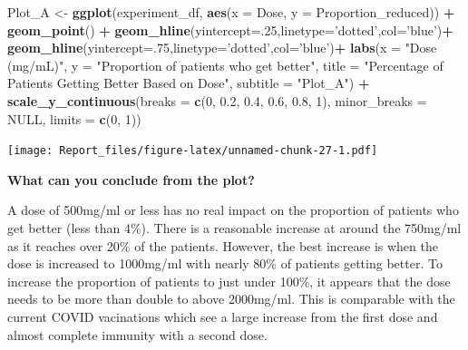 \documentclass[
]{article}
\newenvironment{Shaded}{\begin{snugshade}}{\end{snugshade}}
\newcommand{\DataTypeTok}[1]{\textcolor[rgb]{0.13,0.29,0.53}{#1}}
\newcommand{\DecValTok}[1]{\textcolor[rgb]{0.00,0.00,0.81}{#1}}
\newcommand{\FloatTok}[1]{\textcolor[rgb]{0.00,0.00,0.81}{#1}}
\newcommand{\KeywordTok}[1]{\textcolor[rgb]{0.13,0.29,0.53}{\textbf{#1}}}
\newcommand{\NormalTok}[1]{#1}
\newcommand{\OperatorTok}[1]{\textcolor[rgb]{0.81,0.36,0.00}{\textbf{#1}}}
\newcommand{\OtherTok}[1]{\textcolor[rgb]{0.56,0.35,0.01}{#1}}
\newcommand{\StringTok}[1]{\textcolor[rgb]{0.31,0.60,0.02}{#1}}
\begin{document}
\begin{Shaded}
\begin{Highlighting}[]
\NormalTok{Plot_A <-}\StringTok{ }
\StringTok{  }\KeywordTok{ggplot}\NormalTok{(experiment_df, }\KeywordTok{aes}\NormalTok{(}\DataTypeTok{x =}\NormalTok{ Dose, }\DataTypeTok{y =}\NormalTok{ Proportion_reduced)) }\OperatorTok{+}
\StringTok{    }\KeywordTok{geom_point}\NormalTok{() }\OperatorTok{+}
\StringTok{    }\KeywordTok{geom_hline}\NormalTok{(}\DataTypeTok{yintercept=}\NormalTok{.}\DecValTok{25}\NormalTok{,}\DataTypeTok{linetype=}\StringTok{'dotted'}\NormalTok{,}\DataTypeTok{col=}\StringTok{'blue'}\NormalTok{)}\OperatorTok{+}
\StringTok{    }\KeywordTok{geom_hline}\NormalTok{(}\DataTypeTok{yintercept=}\NormalTok{.}\DecValTok{75}\NormalTok{,}\DataTypeTok{linetype=}\StringTok{'dotted'}\NormalTok{,}\DataTypeTok{col=}\StringTok{'blue'}\NormalTok{)}\OperatorTok{+}
\StringTok{    }\KeywordTok{labs}\NormalTok{(}\DataTypeTok{x =} \StringTok{"Dose (mg/mL)"}\NormalTok{,}
          \DataTypeTok{y =} \StringTok{"Proportion of patients who get better"}\NormalTok{,}
          \DataTypeTok{title =} \StringTok{"Percentage of Patients Getting Better Based on Dose"}\NormalTok{,}
          \DataTypeTok{subtitle =} \StringTok{"Plot_A"}\NormalTok{) }\OperatorTok{+}
\StringTok{    }\KeywordTok{scale_y_continuous}\NormalTok{(}\DataTypeTok{breaks =} \KeywordTok{c}\NormalTok{(}\DecValTok{0}\NormalTok{, }\FloatTok{0.2}\NormalTok{, }\FloatTok{0.4}\NormalTok{, }\FloatTok{0.6}\NormalTok{, }\FloatTok{0.8}\NormalTok{, }\DecValTok{1}\NormalTok{),}
                        \DataTypeTok{minor_breaks =} \OtherTok{NULL}\NormalTok{,}
                        \DataTypeTok{limits =} \KeywordTok{c}\NormalTok{(}\DecValTok{0}\NormalTok{, }\DecValTok{1}\NormalTok{))}
\end{Highlighting}
\end{Shaded}

\texttt{[image: Report\_files/figure-latex/unnamed-chunk-27-1.pdf]}

\textbf{What can you conclude from the plot?}

A dose of 500mg/ml or less has no real impact on the proportion of
patients who get better (less than 4\%). There is a reasonable increase
at around the 750mg/ml as it reaches over 20\% of the patients. However,
the best increase is when the dose is increased to 1000mg/ml with nearly
80\% of patients getting better. To increase the proportion of patients
to just under 100\%, it appears that the dose needs to be more than
double to above 2000mg/ml. This is comparable with the current COVID
vacinations which see a large increase from the first dose and almost
complete immunity with a second dose.
\end{document}

